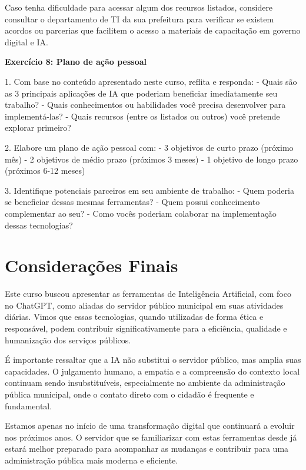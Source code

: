 \documentclass[12pt,a4paper]{book}
\begin{document}
\begin{tcolorbox}[dica]
Caso tenha dificuldade para acessar algum dos recursos listados, considere consultar o departamento de TI da sua prefeitura para verificar se existem acordos ou parcerias que facilitem o acesso a materiais de capacitação em governo digital e IA.
\end{tcolorbox}

\begin{tcolorbox}[pratica]
\textbf{Exercício 8: Plano de ação pessoal}

1. Com base no conteúdo apresentado neste curso, reflita e responda:
   - Quais são as 3 principais aplicações de IA que poderiam beneficiar imediatamente seu trabalho?
   - Quais conhecimentos ou habilidades você precisa desenvolver para implementá-las?
   - Quais recursos (entre os listados ou outros) você pretende explorar primeiro?

2. Elabore um plano de ação pessoal com:
   - 3 objetivos de curto prazo (próximo mês)
   - 2 objetivos de médio prazo (próximos 3 meses)
   - 1 objetivo de longo prazo (próximos 6-12 meses)

3. Identifique potenciais parceiros em seu ambiente de trabalho:
   - Quem poderia se beneficiar dessas mesmas ferramentas?
   - Quem possui conhecimento complementar ao seu?
   - Como vocês poderiam colaborar na implementação dessas tecnologias?
\end{tcolorbox}

\chapter*{Considerações Finais}

Este curso buscou apresentar as ferramentas de Inteligência Artificial, com foco no ChatGPT, como aliadas do servidor público municipal em suas atividades diárias. Vimos que essas tecnologias, quando utilizadas de forma ética e responsável, podem contribuir significativamente para a eficiência, qualidade e humanização dos serviços públicos.

É importante ressaltar que a IA não substitui o servidor público, mas amplia suas capacidades. O julgamento humano, a empatia e a compreensão do contexto local continuam sendo insubstituíveis, especialmente no ambiente da administração pública municipal, onde o contato direto com o cidadão é frequente e fundamental.

Estamos apenas no início de uma transformação digital que continuará a evoluir nos próximos anos. O servidor que se familiarizar com estas ferramentas desde já estará melhor preparado para acompanhar as mudanças e contribuir para uma administração pública mais moderna e eficiente.
\end{document}
